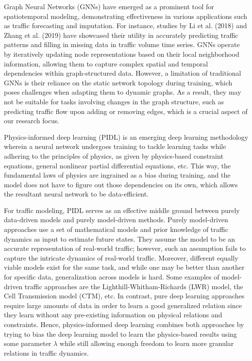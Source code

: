 \documentclass[conference]{IEEEtran}
\begin{document}
Graph Neural Networks (GNNs)\cite{gnn} have emerged as a prominent tool for spatiotemporal modeling, demonstrating effectiveness in various applications such as traffic forecasting and imputation. For instance, studies by Li et al. (2018) and Zhang et al. (2019) have showcased their utility in accurately predicting traffic patterns and filling in missing data in traffic volume time series. GNNs operate by iteratively updating node representations based on their local neighborhood information, allowing them to capture complex spatial and temporal dependencies within graph-structured data. However, a limitation of traditional GNNs is their reliance on the static network topology during training, which poses challenges when adapting them to dynamic graphs. As a result, they may not be suitable for tasks involving changes in the graph structure, such as predicting traffic flow upon adding or removing edges, which is a crucial aspect of our research focus.

Physics-informed deep learning (PIDL)\cite{raissi2017physics} is an emerging deep learning methodology wherein a neural network undergoes training to tackle learning tasks while adhering to the principles of physics, as given by physics-based constraint equations, general nonlinear partial differential equations, etc. This way, the fundamental laws of physics are ingrained as a bias during training, and the model does not have to figure out those dependencies on its own, which allows the resultant neural network to be data-efficient.

For traffic modeling, PIDL serves as an effective middle ground between purely data-driven models and purely model-driven methods. Purely model-driven approaches use a set of mathematical models and prior knowledge of traffic dynamics as input to estimate future states. They assume the model to be an accurate representation of real-world traffic; however, such an assumption fails to capture the intricate dynamics of real-world traffic. Moreover, different equally viable models exist for the same task, and while one may be better than another for specific data, generalization across models is hard. Some examples of model-driven traffic approaches are the Lighthill-Whitham-Richards (LWR)\cite{lwr} model, the Cell Transmission model (CTM)\cite{ctm}, etc. In contrast, pure deep learning approaches require large amounts of data in order to learn a good generalized relation since they learn without any pre-existing information on physical relations and constraints. Hence, physics-informed deep learning combines both approaches by trying to bias the deep learning model to learn the physics-based results using some parameter $\lambda$ while still allowing enough freedom to learn more granular relations in traffic dynamics.
\end{document}

